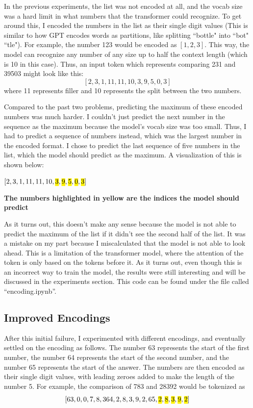 \documentclass{article}
\begin{document}
In the previous experiments, the list was not encoded at all, and the vocab size was a hard limit in what numbers that the transformer could recognize. To get around this, I encoded the numbers in the list as their single digit values (This is similar to how GPT encodes words as partitions, like splitting ``bottle" into ``bot" ``tle"). For example, the number 123 would be encoded as $[1, 2, 3]$. This way, the model can recognize any number of any size up to half the context length (which is 10 in this case). Thus, an input token which represents comparing 231 and 39503 might look like this:
$$
[2, 3, 1, 11, 11, 10, 3, 9, 5, 0, 3]
$$
where 11 represents filler and 10 represents the split between the two numbers. 

Compared to the past two problems, predicting the maximum of these encoded numbers was much harder. I couldn't just predict the next number in the sequence as the maximum because the model's vocab size was too small. Thus, I had to predict a sequence of numbers instead, which was the largest number in the encoded format. I chose to predict the last sequence of five numbers in the list, which the model should predict as the maximum. A visualization of this is shown below:

\begin{center}
    $[2, 3, 1, 11, 11, 10, \text{\hl{3}}, \text{\hl{9}}, \text{\hl{5}}, \text{\hl{0}}, \text{\hl{3}}]$

    \textbf{The numbers highlighted in yellow are the indices the model should predict}
\end{center}

As it turns out, this doesn't make any sense because the model is not able to predict the maximum of the list if it didn't see the second half of the list. It was a mistake on my part because I miscalculated that the model is not able to look ahead. This is a limitation of the transformer model, where the attention of the token is only based on the tokens before it. As it turns out, even though this is an incorrect way to train the model, the results were still interesting and will be discussed in the experiments section. This code can be found under the file called ``encoding.ipynb''. 

\subsection{Improved Encodings}
After this initial failure, I experimented with different encodings, and eventually settled on the encoding as follows. The number 63 represents the start of the first number, the number 64 represents the start of the second number, and the number 65 represents the start of the answer. The numbers are then encoded as their single digit values, with leading zeroes added to make the length of the number 5. For example, the comparison of 783 and 28392 would be tokenized as
$$
[63, 0, 0, 7, 8, 3 64, 2, 8, 3, 9, 2, 65, \text{\hl{2}}, \text{\hl{8}}, \text{\hl{3}}, \text{\hl{9}}, \text{\hl{2}}]
$$
\end{document}
